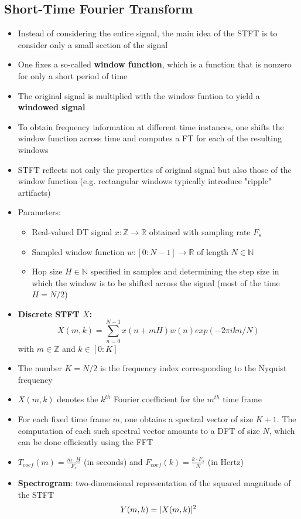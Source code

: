 \documentclass{scrartcl}
\DeclarePairedDelimiter\abs{\lvert}{\rvert}%
\newcommand{\ffrac}[2]{\ensuremath{\frac{\displaystyle #1}{\displaystyle #2}}}
\begin{document}
\subsection{Short-Time Fourier Transform}
\begin{itemize}
    \item
        Instead of considering the entire signal, the main idea of the STFT is to consider only a small section of the signal 
    \item
        One fixes a so-called \textbf{window function}, which is a function that is nonzero for only a short period of time
    \item
        The original signal is multiplied with the window funtion to yield a \textbf{windowed signal}
    \item
        To obtain frequency information at different time instances, one shifts the window function across time and computes a FT for each of the resulting windows
    \item
        STFT reflects not only the properties of original signal but also those of the window function (e.g. rectangular windows typically introduce "ripple" artifacts)
    \item
        Parameters:
        \begin{itemize}
            \item
                Real-valued DT signal $x: \mathbb{Z} \rightarrow \mathbb{R}$ obtained with sampling rate $F_s$
            \item
                Sampled window function $w: [0:N-1] \rightarrow \mathbb{R}$ of length $N \in \mathbb{N}$
            \item
                Hop size $H \in \mathbb{N}$ specified in samples and determining the step size in which the window is to be shifted across the signal (most of the time $H = N/2$)
        \end{itemize}
    \item
        \textbf{Discrete STFT $X$:}
        $$X(m,k) = \sum_{n=0}^{N-1} x(n+mH)w(n)exp(-2\pi i k n/N)$$
        with $m \in \mathbb{Z}$ and $k \in [0:K]$
    \item
        The number $K = N/2$ is the frequency index corresponding to the Nyquist frequency
    \item
        $X(m,k)$ denotes the $k^{th}$ Fourier coefficient for the $m^{th}$ time frame
    \item
        For each fixed time frame $m$, one obtains a spectral vector of size $K+1$. The computation of each such spectral vector amounts to a DFT of size $N$, which can be done efficiently using the FFT
    \item
        $T_{coef}(m) = \ffrac{m \cdot H}{F_s}$ (in seconds) and $F_{coef}(k) = \ffrac{k \cdot F_s}{N}$ (in Hertz)
    \item
        \textbf{Spectrogram}: two-dimensional representation of the squared magnitude of the STFT
        $$Y(m,k) = \abs{X(m,k)}^2$$
\end{itemize}
\end{document}
